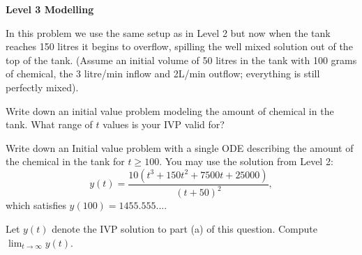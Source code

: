 \documentclass{workbook}
\begin{document}
\begin{slide}
	{\bfseries Level 3 Modelling}

	\question
	In this problem we use the same setup as in Level 2 but now when the tank reaches 150 litres it begins to overflow, spilling the well mixed solution out of the top of the tank. (Assume an initial volume of 50 litres in the tank with 100 grams of chemical, the 3 litre/min inflow and 2L/min outflow; everything is still perfectly mixed).


	\begin{parts}  
		
	\item Write down an initial value problem modeling the amount of chemical in the tank. What range of $t$ values is your IVP valid for?


    \item Write down an Initial value problem with a single ODE describing the amount of the chemical in the tank for $t\geq 100$. You may use the solution from Level 2: 
    \begin{equation*}
        y(t)=\frac{10(t^3+150t^2+7500t+25000)}{(t+50)^2},
    \end{equation*}
    which satisfies $y(100)=1455.555...$.
    

    \item Let $y(t)$ denote the IVP solution to part (a) of this question. Compute $\displaystyle \lim_{t\rightarrow \infty}y(t).$
	\end{parts}

\end{slide}
\end{document}
